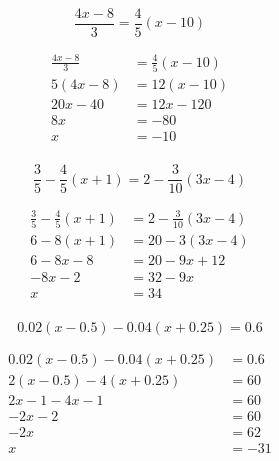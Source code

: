 \documentclass[letterpaper, landscape]{exam}
\begin{document}
\begin{questions}
    \question[10]
      \[ 
        \frac{4x - 8}{3} = \frac{4}{5} (x - 10)
      \]

      \begin{solution}
        \begin{align*}
          \frac{4x - 8}{3} & = \frac{4}{5} (x - 10) \\
          5 (4x - 8)       & = 12 (x - 10) \\
          20x - 40         & = 12x - 120 \\
          8x               & = -80 \\
          x                & = \boxed{ -10 } \\
        \end{align*}
      \end{solution}

    \ifprintanswers{}
      \newpage
    \fi

    \question[10]
      \[
        \frac{3}{5} - \frac{4}{5} (x + 1) = 2 - \frac{3}{10} (3x - 4)
      \]

      \begin{solution}
        \begin{align*}
          \frac{3}{5} - \frac{4}{5} (x + 1) & = 2 - \frac{3}{10} (3x - 4) \\
          6 - 8(x + 1)                      & = 20 - 3 (3x - 4) \\
          6 - 8x - 8                        & = 20 - 9x + 12 \\
          - 8x - 2                          & = 32 - 9x \\
          x                                 & = \boxed{ 34 } \\
        \end{align*}
      \end{solution}

    \question[10] 
      \[
        0.02 (x - 0.5) - 0.04 (x + 0.25) = 0.6
      \]

      \begin{solution}
        \begin{align*}
          0.02 (x - 0.5) - 0.04 (x + 0.25) & = 0.6 \\
          2 (x - 0.5) - 4 (x + 0.25)       & = 60 \\
          2x - 1 - 4x - 1                  & = 60 \\
          -2x - 2                          & = 60 \\
          -2x                              & = 62 \\
          x                                & = \boxed{ -31 } \\
        \end{align*}
      \end{solution}


\end{questions}
\end{document}
